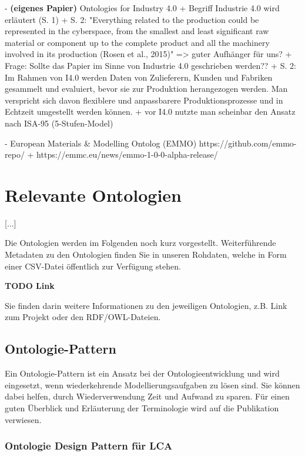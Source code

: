 \documentclass{article}
\begin{document}
- \textbf{(eigenes Papier)} Ontologies for Industry 4.0 \cite{kumar2019ontologies}
  + Begriff Industrie 4.0 wird erläutert (S. 1)
  + S. 2: "Everything related to the production could be represented in the cyberspace, from the smallest and least significant raw material or component up to the complete product and all the machinery
  involved in its production (Rosen et al., 2015)" => guter Aufhänger für uns?
  + Frage: Sollte das Papier im Sinne von Industrie 4.0 geschrieben werden??
  + S. 2: Im Rahmen von I4.0 werden Daten von Zulieferern, Kunden und Fabriken gesammelt und evaluiert, bevor sie zur Produktion herangezogen werden. Man verspricht sich davon flexiblere und anpassbarere Produktionsprozesse und in Echtzeit umgestellt werden können.
  + vor I4.0 nutzte man scheinbar den Ansatz nach ISA-95 (5-Stufen-Model)



- European Materials \& Modelling Ontolog (EMMO) https://github.com/emmo-repo/ + https://emmc.eu/news/emmo-1-0-0-alpha-release/

\section{Relevante Ontologien}

[...]

Die Ontologien werden im Folgenden noch kurz vorgestellt.
Weiterführende Metadaten zu den Ontologien finden Sie in unseren Rohdaten, welche in Form einer CSV-Datei öffentlich zur Verfügung stehen.

\textbf{TODO Link}

Sie finden darin weitere Informationen zu den jeweiligen Ontologien, z.B. Link zum Projekt oder den RDF/OWL-Dateien.

\subsection{Ontologie-Pattern}


Ein Ontologie-Pattern ist ein Ansatz bei der Ontologieentwicklung und wird eingesetzt, wenn wiederkehrende Modellierungsaufgaben zu lösen sind.
Sie können dabei helfen, durch Wiederverwendung Zeit und Aufwand zu sparen.
Für einen guten Überblick und Erläuterung der Terminologie wird auf die Publikation \cite{falbo2013ontology} verwiesen.

\subsubsection{Ontologie Design Pattern für LCA}
\end{document}

